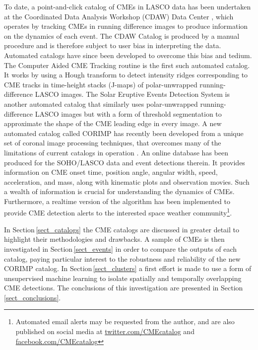 \documentclass[referee,a4paper,12pt,traditabstract]{swsc}
\begin{document}
To date, a point-and-click catalog of CMEs in LASCO data has been undertaken at the Coordinated Data Analysis Workshop (CDAW) Data Center \citep{2009EM&P..104..295G}, which operates by tracking CMEs in running difference images to produce information on the dynamics of each event. The CDAW Catalog is produced by a manual procedure and is therefore subject to user bias in interpreting the data. Automated catalogs have since been developed to overcome this bias and tedium. The Computer Aided CME Tracking routine \cite[CACTus;][]{2004A&A...425.1097R} is the first such automated catalog. It works by using a Hough transform \citep{Hough1962} to detect intensity ridges corresponding to CME tracks in time-height stacks (J-maps) of polar-unwrapped running-difference LASCO images. The Solar Eruptive Events Detection System \cite[SEEDS;][]{2008SoPh..248..485O} is another automated catalog that similarly uses polar-unwrapped running-difference LASCO images but with a form of threshold segmentation to approximate the shape of the CME leading edge in every image. A new automated catalog called CORIMP has recently been developed from a unique set of coronal image processing techniques, that overcomes many of the limitations of current catalogs in operation \citep{2012ApJ...752..144M,2012ApJ...752..145B}. An online database has been produced for the SOHO/LASCO data and event detections therein. It provides information on CME onset time, position angle, angular width, speed, acceleration, and mass, along with kinematic plots and observation movies. Such a wealth of information is crucial for understanding the dynamics of CMEs. Furthermore, a realtime version of the algorithm has been implemented to provide CME detection alerts to the interested space weather community\footnote{Automated email alerts may be requested from the author, and are also published on social media at \href{https://www.twitter.com/CMEcatalog}{twitter.com/CMEcatalog} and \href{https://www.facebook.com/CMEcatalog}{facebook.com/CMEcatalog}}.

In Section\,\ref{sect_catalogs} the CME catalogs are discussed in greater detail to highlight their methodologies and drawbacks. A sample of CMEs is then investigated in Section\,\ref{sect_events} in order to compare the outputs of each catalog, paying particular interest to the robustness and reliability of the new CORIMP catalog. In Section\,\ref{sect_clusters} a first effort is made to use a form of unsupervised machine learning to isolate spatially and temporally overlapping CME detections. The conclusions of this investigation are presented in Section\,\ref{sect_conclusions}.
\end{document}
